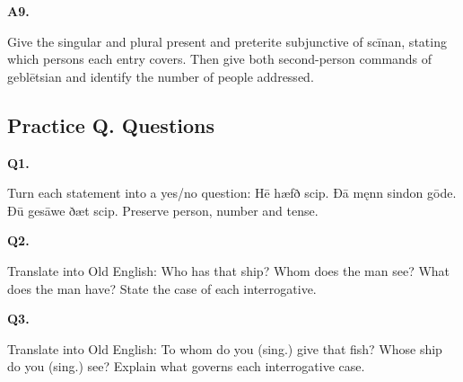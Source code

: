 \par\begin{minipage}{\linewidth}\raggedright
\textbf{A9.}

Give the singular and plural present and preterite subjunctive of scīnan, stating which persons each entry covers. Then give both second-person commands of geblētsian and identify the number of people addressed.

\end{minipage}\par\addvspace{4pt}

\subsection*{Practice Q. Questions}

\par\begin{minipage}{\linewidth}\raggedright
\textbf{Q1.}

Turn each statement into a yes/\allowbreak{}no question: Hē hæfð scip. Ðā męnn sindon gōde. Ðū gesāwe ðæt scip. Preserve person, number and tense.

\end{minipage}\par\addvspace{4pt}

\par\begin{minipage}{\linewidth}\raggedright
\textbf{Q2.}

Translate into Old English: Who has that ship? Whom does the man see? What does the man have? State the case of each interrogative.

\end{minipage}\par\addvspace{4pt}

\par\begin{minipage}{\linewidth}\raggedright
\textbf{Q3.}

Translate into Old English: To whom do you (sing.) give that fish? Whose ship do you (sing.) see? Explain what governs each interrogative case.

\end{minipage}\par\addvspace{4pt}

